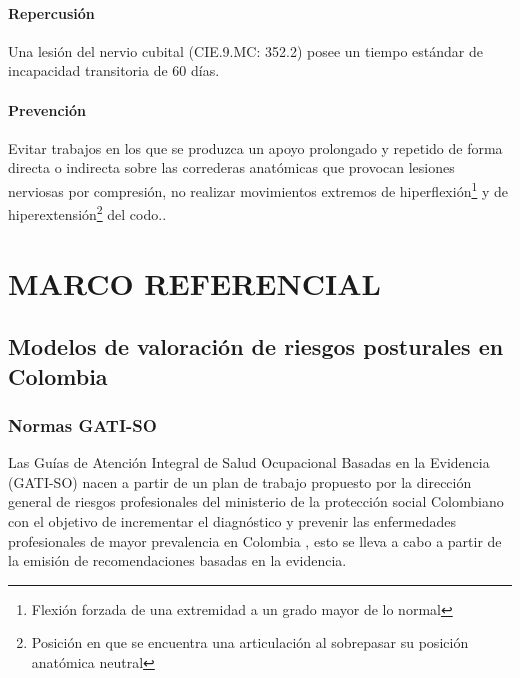 \paragraph{Repercusión}
Una lesión del nervio cubital (CIE.9.MC: 352.2) posee un tiempo estándar de incapacidad transitoria de 60 días\parencite[6]{INSHT2017SindromeCodo}.
\paragraph{Prevención}
Evitar trabajos en los que se produzca un apoyo prolongado y repetido de forma directa o indirecta sobre las correderas anatómicas que provocan lesiones nerviosas por compresión, no realizar movimientos extremos de hiperflexión\footnote{Flexión forzada de una extremidad a un grado mayor de lo normal} y de hiperextensión\footnote{Posición en que se encuentra una articulación al sobrepasar su posición anatómica neutral} del codo.\parencite[5]{INSHT2017SindromeCodo}.


\section{MARCO REFERENCIAL}
\subsection{Modelos de valoración de riesgos posturales en Colombia}
\subsubsection{Normas GATI-SO}
Las Guías de Atención Integral de Salud Ocupacional Basadas en la Evidencia (GATI-SO) nacen a partir de un plan de trabajo propuesto por la dirección general de riesgos profesionales del ministerio de la protección social Colombiano con el objetivo de incrementar el diagnóstico y prevenir las enfermedades profesionales de
mayor prevalencia en Colombia \parencite[6]{MinisteriodeProteccionSocialdeColombia2006GuiaSuperiores}, esto se lleva a cabo a partir de la emisión de recomendaciones basadas en la evidencia.

